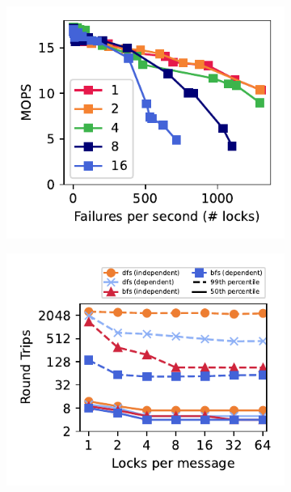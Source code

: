 \begin{figure}[t]
    \centering
    \begin{subfigure}{0.24\linewidth}
      \includegraphics[width=0.99\linewidth]{fig/fault-rate.pdf}
          \end{subfigure}
    \begin{subfigure}{0.24\linewidth}
        \includegraphics[width=0.99\linewidth]{fig/search_dependence.pdf}
    \end{subfigure}
    \begin{subfigure}{0.24\linewidth}

\end{subfigure}
\end{figure}
